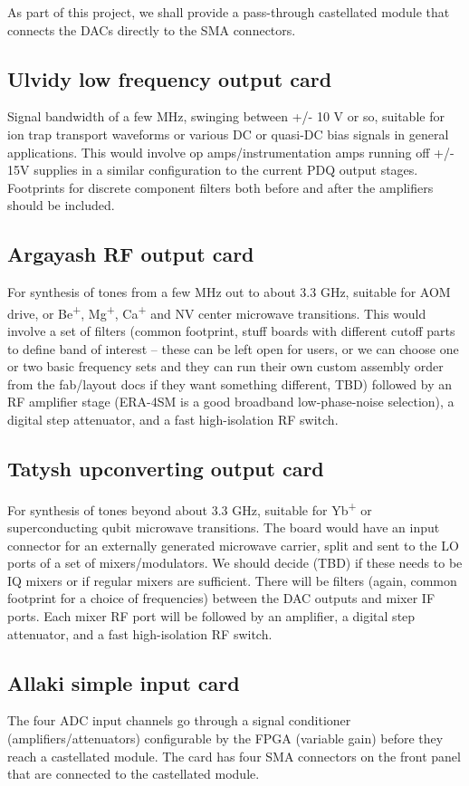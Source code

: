 \documentclass[11pt]{paper}
\begin{document}
As part of this project, we shall provide a pass-through castellated module that connects the DACs directly to the SMA connectors.

\subsection{Ulvidy low frequency output card}
Signal bandwidth of a few MHz, swinging between +/- 10 V or so, suitable for ion trap transport waveforms or various DC or quasi-DC bias signals in general applications. This would involve op amps/instrumentation amps running off +/- 15V supplies in a similar configuration to the current PDQ output stages. Footprints for discrete component filters both before and after the amplifiers should be included.

\subsection{Argayash RF output card}
For synthesis of tones from a few MHz out to about 3.3 GHz, suitable for AOM drive, or Be\textsuperscript{+}, Mg\textsuperscript{+}, Ca\textsuperscript{+} and NV center microwave transitions. This would involve a set of filters (common footprint, stuff boards with different cutoff parts to define band of interest -- these can be left open for users, or we can choose one or two basic frequency sets and they can run their own custom assembly order from the fab/layout docs if they want something different, TBD) followed by an RF amplifier stage (ERA-4SM is a good broadband low-phase-noise selection), a digital step attenuator, and a fast high-isolation RF switch.

\subsection{Tatysh upconverting output card}
For synthesis of tones beyond about 3.3 GHz, suitable for Yb\textsuperscript{+} or superconducting qubit microwave transitions. The board would have an input connector for an externally generated microwave carrier, split and sent to the LO ports of a set of mixers/modulators. We should decide (TBD) if these needs to be IQ mixers or if regular mixers are sufficient. There will be filters (again, common footprint for a choice of frequencies) between the DAC outputs and mixer IF ports. Each mixer RF port will be followed by an amplifier, a digital step attenuator, and a fast high-isolation RF switch.

\subsection{Allaki simple input card}
The four ADC input channels go through a signal conditioner (amplifiers/attenuators) configurable by the FPGA (variable gain) before they reach a castellated module. The card has four SMA connectors on the front panel that are connected to the castellated module.
\end{document}
